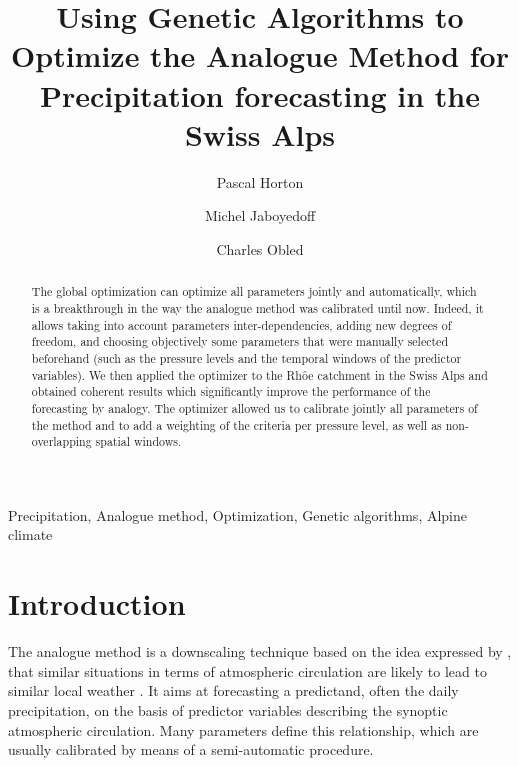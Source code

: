 \documentclass[5p]{elsarticle}
\begin{document}
\begin{frontmatter}

\title{Using Genetic Algorithms to Optimize the Analogue Method for Precipitation forecasting in the Swiss Alps}

\author[unil,terranum]{Pascal Horton}

\author[unil]{Michel Jaboyedoff}
\author[lthe]{Charles Obled}

\address[unil]{University of Lausanne, Lausanne, Switzerland}
\address[terranum]{Terranum LLC, Rue de l'industrie 35 bis, 1030 Bussigny, Switzerland}
\address[lthe]{Universit\'{e} de Grenoble-Alpes, LTHE, Grenoble, France}

\begin{abstract}
The global optimization can optimize all parameters jointly and automatically, which is a breakthrough in the way the analogue method was calibrated until now. Indeed, it allows taking into account parameters inter-dependencies, adding new degrees of freedom, and choosing objectively some parameters that were manually selected beforehand (such as the pressure levels and the temporal windows of the predictor variables).
We then applied the optimizer to the Rh\^{o}e catchment in the Swiss Alps and obtained coherent results which significantly improve the performance of the forecasting by analogy. The optimizer allowed us to calibrate jointly all parameters of the method and to add a weighting of the criteria per pressure level, as well as non-overlapping spatial windows.
\end{abstract}

\begin{keyword}
Precipitation\sep
Analogue method\sep
Optimization\sep
Genetic algorithms\sep
Alpine climate
\end{keyword}

\end{frontmatter}

\linenumbers

\section{Introduction}
\label{section_intro}

The analogue method is a downscaling technique based on the idea expressed by \citet{Lorenz1969}, that similar situations in terms of atmospheric circulation are likely to lead to similar local weather \citep{Bontron2005}. It aims at forecasting a predictand, often the daily precipitation, on the basis of predictor variables describing the synoptic atmospheric circulation. Many parameters define this relationship, which are usually calibrated by means of a semi-automatic procedure.
\end{document}

